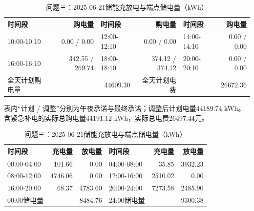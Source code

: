 \begin{table}[H]\centering\small\setlength{\tabcolsep}{5pt}
\caption{问题三：2025-06-21购电结果（电量：kWh；费用：元）}
\begin{tabular}{lrlrlr}\toprule
时间段 & 购电量 & 时间段 & 购电量 & 时间段 & 购电量 \\\midrule
10:00-10:10 & 0.00 / 0.00 & 12:00-12:10 & 0.00 / 0.00 & 14:00-14:10 & 0.00 / 0.00\\
16:00-16:10 & 342.55 / 269.74 & 18:00-18:10 & 374.12 / 374.12 & 20:00-20:10 & 0.00 / 0.00\\
\midrule 全天计划购电量 & \multicolumn{2}{r}{44609.30} & 全天计划电费 & \multicolumn{2}{r}{26672.36}\\\bottomrule
\end{tabular}
\par\vspace{2pt}\footnotesize
表内“计划 / 调整”分别为午夜承诺与最终承诺；调整后计划电量44189.74 kWh。
含紧急补电的实际总购电量44191.12 kWh，实际总电费26497.44元。
\vspace{3pt}\small
\caption{问题三：2025-06-21储能充放电与端点储电量（kWh）}
\begin{tabular}{lrrlrr}\toprule
时间段 & 充电量 & 放电量 & 时间段 & 充电量 & 放电量 \\\midrule
00:00-04:00 & 101.66 & 0.00 & 04:00-08:00 & 35.85 & 3932.23\\
08:00-12:00 & 4746.06 & 0.00 & 12:00-16:00 & 2510.02 & 0.00\\
16:00-20:00 & 68.37 & 4783.60 & 20:00-24:00 & 7273.58 & 2485.90\\
\midrule 00:00储电量 & \multicolumn{2}{r}{8484.76} & 24:00储电量 & \multicolumn{2}{r}{9300.38}\\\bottomrule
\end{tabular}\end{table}
